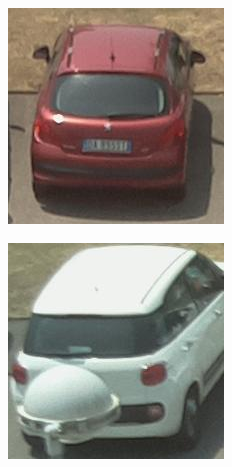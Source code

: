 \begin{figure}
\begin{subfigure}{0.25\columnwidth}%
\includegraphics[width=\columnwidth]{38busy}%
\end{subfigure}%
\begin{subfigure}{0.25\columnwidth}%
\includegraphics[width=\columnwidth]{34busy}%

\end{subfigure}
\end{figure}
